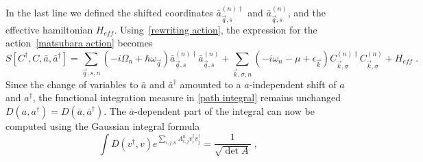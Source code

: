\documentclass{article}
\begin{document}
In the last line we defined the shifted coordinates  $\bar{a}^{(n)\dagger}_{\vec{q},s}$ and $\bar{a}^{(n)}_{\vec{q},s}$, and the effective hamiltonian $H_{eff}$. Using~\cref{rewriting action}, the expression for the action~\cref{matsubara action} becomes
\begin{equation}
     S[C^{\dagger},C,\bar{a},\bar{a}^{\dagger}] = \sum_{\vec{q},s,n} \left(-i\Omega_n + \hbar \omega_{\vec{q}}\right)  \bar{a}^{(n)\dagger}_{\vec{q},s}\bar{a}^{(n)}_{\vec{q},s} + \sum_{\vec{k},\sigma, n} \left(-i\omega_n - \mu + \epsilon_{\vec{k}}\right) C^{(n)\dagger}_{\vec{k},\sigma} C^{(n)}_{\vec{k},\sigma} +  H_{eff} \;.
     \label{action shifted coordinates}
\end{equation}
Since the change of variables to $\bar{a}$ and $\bar{a}^{\dagger}$ amounted to a $a$-independent shift of $a$ and $a^{\dagger}$, the functional integration measure in \cref{path integral} remains unchanged $D(a,a^{\dagger}) = D(\bar{a},\bar{a}^{\dagger})$. 
The $\bar{a}$-dependent part of the integral can now be computed using the Gaussian integral formula~\cite{Altland}
\begin{equation}
    \int D(v^{\dagger},v) e^{\sum_{i,j,n} A_{i,j}^{n} v_i^{\dagger} v_j^{\dagger}} = \frac{1}{\sqrt{\det{A}}} \;,
    \label{gaussian integral}
\end{equation}


\printbibliography
\end{document}
